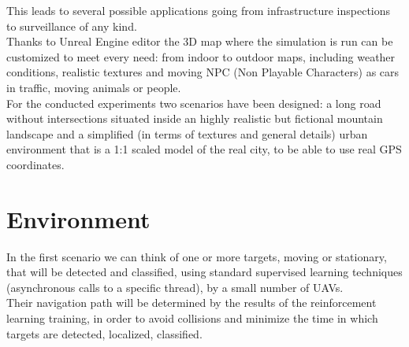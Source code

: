 \documentclass[LaM,binding=0.6cm]{sapthesis}
\begin{document}
This leads to several possible applications going from infrastructure inspections to surveillance of any kind.\\

Thanks to Unreal Engine editor the 3D map where the simulation is run can be customized to meet every need: from indoor to outdoor maps, including weather conditions, realistic textures and moving NPC (Non Playable Characters) as cars in traffic, moving animals or people. \\ %

For the conducted experiments two scenarios have been designed: a long road without intersections situated inside an highly realistic but fictional mountain landscape and a simplified (in terms of textures and general details)
urban environment that is a 1:1 scaled model of the real city, to be able to use real GPS coordinates. \\




\section*{Environment}
In the first scenario we can think of one or more targets, moving or stationary, that will be detected and classified, using standard supervised learning techniques (asynchronous calls to a specific thread), by a small number of UAVs. \\
Their navigation path will be determined by the results of the reinforcement learning training, in order to avoid collisions and minimize the time in which targets are detected, localized, classified.
\end{document}
